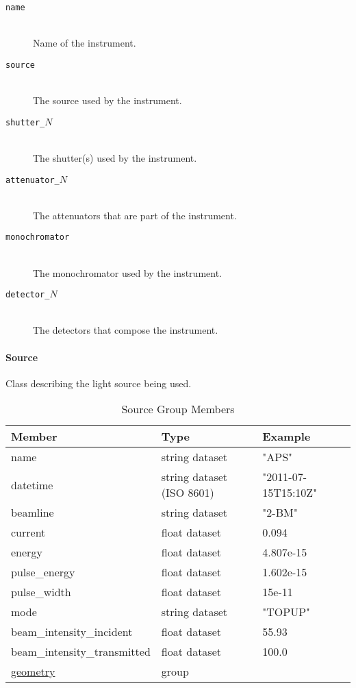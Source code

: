 \begin{description}
\item[\tt {name}] \hfill \\
{Name of the instrument.}

\item[\tt {source}] \hfill \\
{The source used by the instrument.}

\item[\tt {shutter\_$N$}] \hfill \\
{The shutter(s) used by the instrument.}

\item[\tt {attenuator\_$N$}] \hfill \\
{The attenuators that are part of the instrument.}

\item[\tt {monochromator}] \hfill \\
{The monochromator used by the instrument.}

\item[\tt {detector\_$N$}] \hfill \\
{The detectors that compose the instrument.}
\end{description}


\paragraph{Source}
\label{table:source}

Class describing the light source being used.

\begin{table}[h!]\sffamily \footnotesize
\centering
\caption{Source Group Members}
\begin{tabular}{l l l}
\toprule
\bfseries Member     & \bfseries Type & \bfseries Example \\
\midrule
name & string dataset & "APS" \\ 
datetime & string dataset (ISO 8601) & "2011-07-15T15:10Z" \\
beamline & string dataset & "2-BM" \\ 
current & float dataset &  0.094 \\
energy & float dataset & 4.807e-15 \\
pulse\_energy & float dataset & 1.602e-15 \\
pulse\_width & float dataset & 15e-11 \\
mode & string dataset & "TOPUP" \\
beam\_intensity\_incident & float dataset & 55.93 \\
beam\_intensity\_transmitted & float dataset & 100.0 \\
\hyperref[table:geometry]{geometry} &  group & \\
\bottomrule
\end{tabular}
\end{table}

